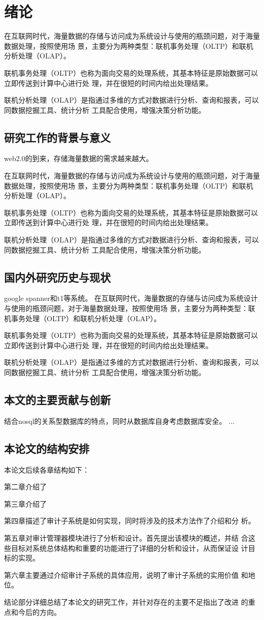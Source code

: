 
\chapter{绪论}
在互联网时代，海量数据的存储与访问成为系统设计与使用的瓶颈问题，对于海量数据处理，按照使用场
景，主要分为两种类型：联机事务处理（OLTP）和联机分析处理（OLAP）。

联机事务处理（OLTP）也称为面向交易的处理系统，其基本特征是原始数据可以立即传送到计算中心进行处
理，并在很短的时间内给出处理结果。

联机分析处理（OLAP）是指通过多维的方式对数据进行分析、查询和报表，可以同数据挖掘工具、统计分析
工具配合使用，增强决策分析功能。
\section{研究工作的背景与意义}
web2.0的到来，存储海量数据的需求越来越大。

在互联网时代，海量数据的存储与访问成为系统设计与使用的瓶颈问题，对于海量数据处理，按照使用场
景，主要分为两种类型：联机事务处理（OLTP）和联机分析处理（OLAP）。

联机事务处理（OLTP）也称为面向交易的处理系统，其基本特征是原始数据可以立即传送到计算中心进行处
理，并在很短的时间内给出处理结果。

联机分析处理（OLAP）是指通过多维的方式对数据进行分析、查询和报表，可以同数据挖掘工具、统计分析
工具配合使用，增强决策分析功能。
\section{国内外研究历史与现状}
google spanner和t1等系统。
在互联网时代，海量数据的存储与访问成为系统设计与使用的瓶颈问题，对于海量数据处理，按照使用场
景，主要分为两种类型：联机事务处理（OLTP）和联机分析处理（OLAP）。

联机事务处理（OLTP）也称为面向交易的处理系统，其基本特征是原始数据可以立即传送到计算中心进行处
理，并在很短的时间内给出处理结果。

联机分析处理（OLAP）是指通过多维的方式对数据进行分析、查询和报表，可以同数据挖掘工具、统计分析
工具配合使用，增强决策分析功能。
\section{本文的主要贡献与创新}

结合nosql的关系型数据库的特点，同时从数据库自身考虑数据库安全。
...
\section{本论文的结构安排}
本论文后续各章结构如下：

第二章介绍了

第三章介绍了

第四章描述了审计子系统是如何实现，同时将涉及的技术方法作了介绍和分
析。

第五章对审计管理器模块进行了分析和设计。首先提出该模块的概述，并结
合这些目标对系统总体结构和重要的功能进行了详细的分析和设计，从而保证设
计目标的实现。

第六章主要通过介绍审计子系统的具体应用，说明了审计子系统的实用价值
和地位。

结论部分详细总结了本论文的研究工作，并针对存在的主要不足指出了改进
的重点和今后的方向。